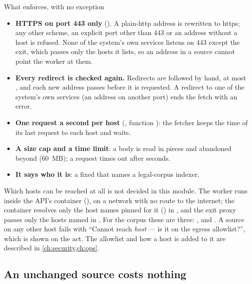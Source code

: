 \begin{codebox}{What  enforces, with no exception}
\begin{itemize}
  \item \textbf{HTTPS on port 443 only} (). A plain-http address is rewritten
    to https; any other scheme, an explicit port other than 443 or an address without a host
    is refused. None of the system's own services listens on 443 except the exit, which passes
    only the hosts it lists, so an address in a source
    cannot point the worker at them.
  \item \textbf{Every redirect is checked again.} Redirects are followed by hand, at most
    , and each new address passes  before it is
    requested. A redirect to one of the system's own services (an address on another port)
    ends the fetch with an error.
  \item \textbf{One request a second per host} (, function
    ): the fetcher keeps the time of its last request to each host and waits.
  \item \textbf{A size cap and a time limit}: a body is read in pieces and abandoned beyond
     (60~MB); a request times out after  seconds.
  \item \textbf{It says who it is}: a fixed  that names a legal-corpus
    indexer.
\end{itemize}
\end{codebox}

Which hosts can be reached at all is not decided in this module. The worker runs inside the
API's container (), on a network with no route to the internet; the
container resolves only the host names pinned for it () in
, and the exit proxy passes only the hosts named in
. For the corpus these are three: ,
 and . A source on any other host fails with
\enquote{Cannot reach \emph{host} --- is it on the egress allowlist?}, which is shown on the
act. The allowlist and how a host is added to it are described in \cref{ch:security,ch:ops}.

\subsection{An unchanged source costs nothing}\label{sec:corpus:unchanged}

